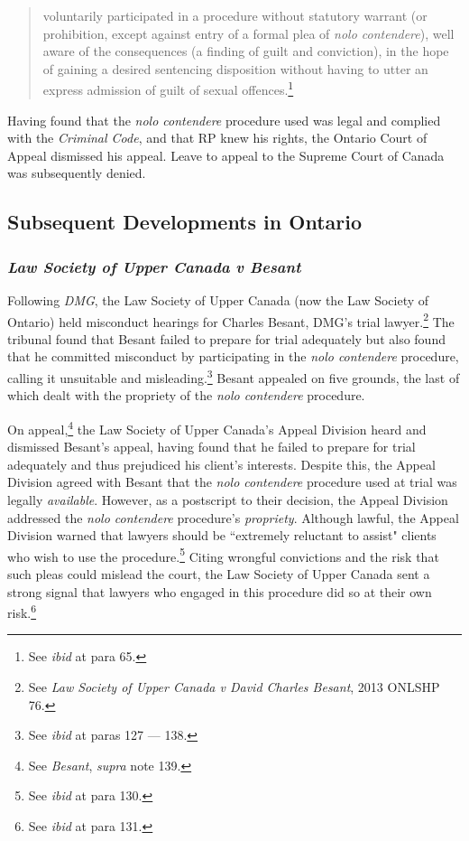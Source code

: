 \begin{quote}
    \singlespacing
    voluntarily participated in a procedure without statutory warrant (or prohibition, except against entry of a formal plea of \textit{nolo contendere}), well aware of the consequences (a finding of guilt and conviction), in the hope of gaining a desired sentencing disposition without having to utter an express admission of guilt of sexual offences.\footnote{See \textit{ibid} at para 65.}
\end{quote} Having found that the \textit{nolo contendere} procedure used was legal and complied with the \textit{Criminal Code}, and that RP knew his rights, the Ontario Court of Appeal dismissed his appeal. Leave to appeal to the Supreme Court of Canada was subsequently denied.

\subsection{Subsequent Developments in Ontario}

\subsubsection{\textit{Law Society of Upper Canada v Besant}}

Following \textit{DMG}, the Law Society of Upper Canada (now the Law Society of Ontario) held misconduct hearings for Charles Besant, DMG's trial lawyer.\footnote{See \textit{Law Society of Upper Canada v David Charles Besant}, 2013 ONLSHP 76.} The tribunal found that Besant failed to prepare for trial adequately but also found that he committed misconduct by participating in the \textit{nolo contendere} procedure, calling it unsuitable and misleading.\footnote{See \textit{ibid} at paras 127 — 138.} Besant appealed on five grounds, the last of which dealt with the propriety of the \textit{nolo contendere} procedure.

On appeal,\footnote{See \textit{Besant}, \textit{supra} note 139.} the Law Society of Upper Canada's Appeal Division heard and dismissed Besant's appeal, having found that he failed to prepare for trial adequately and thus prejudiced his client's interests. Despite this, the Appeal Division agreed with Besant that the \textit{nolo contendere} procedure used at trial was legally \textit{available}. However, as a postscript to their decision, the Appeal Division addressed the \textit{nolo contendere} procedure's \textit{propriety}. Although lawful, the Appeal Division warned that lawyers should be ``extremely reluctant to assist" clients who wish to use the procedure.\footnote{See \textit{ibid} at para 130.} Citing wrongful convictions and the risk that such pleas could mislead the court, the Law Society of Upper Canada sent a strong signal that lawyers who engaged in this procedure did so at their own risk.\footnote{See \textit{ibid} at para 131.} 

